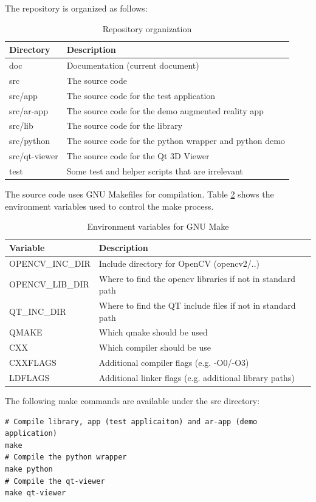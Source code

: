 \documentclass[11pt,a4paper,titlepage,oneside]{report}
\begin{document}
The repository is organized as follows:
\begin{table}[H]
  \centering
  \begin{tabular}{|l|l|}
    Directory & Description\\
    \hline
    doc & Documentation (current document)\\
    src  & The source code\\
    src/app & The source code for the test application\\
    src/ar-app & The source code for the demo augmented reality app\\
    src/lib & The source code for the library\\
    src/python & The source code for the python wrapper and python demo\\
    src/qt-viewer & The source code for the Qt 3D Viewer\\
    test & Some test and helper scripts that are irrelevant
  \end{tabular}
\caption{Repository organization}
\label{tab:organization}
\end{table}

The source code uses GNU Makefiles for compilation. Table \ref{tab:envvars} shows the environment variables used to control the make process.
\begin{table}[H]
  \centering
  \begin{tabular}{|l|l|}
    Variable & Description\\
    \hline
    OPENCV\_INC\_DIR & Include directory for OpenCV (opencv2/..)\\
    OPENCV\_LIB\_DIR & Where to find the opencv libraries if not in standard path\\
    QT\_INC\_DIR & Where to find the QT include files if not in standard path\\
    QMAKE & Which qmake should be used\\
    CXX & Which compiler should be use\\
    CXXFLAGS & Additional compiler flags (e.g. -O0/-O3)\\
    LDFLAGS & Additional linker flags (e.g.  additional library paths)
  \end{tabular}
\caption{Environment variables for GNU Make}
\label{tab:envvars}
\end{table}

The following make commands are available under the src directory:
\begin{lstlisting}
# Compile library, app (test applicaiton) and ar-app (demo application)
make 
# Compile the python wrapper
make python 
# Compile the qt-viewer
make qt-viewer
\end{lstlisting}
\end{document}
